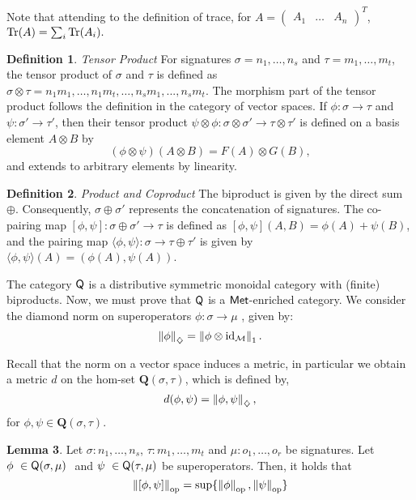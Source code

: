\documentclass[10pt,a4paper]{amsart}
\theoremstyle{definition}
\newtheorem{definition}{Definition}[section]
\theoremstyle{definition}
\theoremstyle{definition}
\newtheorem{lemma}[definition]{Lemma}
\theoremstyle{definition}
\theoremstyle{definition}
\theoremstyle{definition}
\begin{document}
Note that attending to the definition of trace, for $A = \begin{pmatrix} A_1 & \ldots & A_n \end{pmatrix}^T$, $\text{Tr}(A) = \sum_i \text{Tr}(A_i).$
 



\begin{definition} \label{def:tensor} \emph{Tensor Product }
  For signatures $\sigma = n_1, \ldots, n_s $ and $\tau= m_1, \ldots, m_t $, the tensor product of $\sigma$ and $\tau$ is defined as $\sigma \otimes \tau = n_1 m_1, \ldots ,n_1 m_t, \ldots, n_s m_1,...,n_s m_t$. 
  The morphism part of the tensor product follows the definition in the category of vector spaces. If $\phi: \sigma \rightarrow \tau$ and $\psi: \sigma' \rightarrow  \tau'$, then their tensor product $\psi \otimes \phi: \sigma \otimes \sigma' \rightarrow  \tau \otimes \tau' $ is defined on a basis element $A \otimes B$ by  
$$
(\phi \otimes \psi)(A \otimes B) = F(A) \otimes G(B),
$$
and extends to arbitrary elements by linearity.
\end{definition}

\begin{definition} \label{def:biproduct} \emph{Product and Coproduct}
  The biproduct is given by the direct sum $\oplus$. Consequently, $\sigma \oplus \sigma'$ represents the concatenation of signatures. The co-pairing map $[\phi, \psi]: \sigma \oplus \sigma' \to \tau$ is defined as  $[\phi, \psi](A, B) = \phi(A) + \psi(B)$, and the pairing map $\langle \phi, \psi \rangle: \sigma \to \tau \oplus \tau'$ is given by  $\langle \phi, \psi \rangle(A) = (\phi(A), \psi(A))$.
\end{definition}

The category $\mathsf{Q}$ is a distributive symmetric monoidal category with (finite) biproducts. Now, we must prove that $\mathsf{Q}$ is a $\mathsf{Met}$-enriched category. We consider the diamond norm on superoperators $\phi: \sigma \rightarrow \mu$ \cite{watrous2018theory}, given by:
 $$\left\lVert \phi \right\rVert_{\diamondsuit} = \left\lVert  \phi \otimes \mathrm{id}_{\mathcal{M}} \right\rVert_{1}.$$

 Recall that the norm on a vector space induces a metric, in particular we obtain a metric $d$ on the hom-set \(\mathbf{Q}(\sigma, \tau)\),  which is defined by,
\[
d(\phi, \psi) = \left\lVert \phi, \psi \right\rVert_{\diamondsuit},
\]
for \( \phi, \psi \in \mathbf{Q}(\sigma, \tau) \).

\begin{lemma} \label{lem_op_max_trace}
  Let $\sigma: n_1, \ldots, n_s$, $\tau: m_1, \ldots, m_t$ and $\mu: o_1, \ldots, o_r$ be signatures. Let $\phi \in \catQ(\sigma,\mu)  $ and $\psi \in \catQ(\tau,\mu) $ be superoperators. Then, it holds that 
  $$ \left\lVert [\phi, \psi] \right\rVert_{\text{op}}= \sup \{ \left\lVert \phi \right\rVert_{\text{op}},\left\lVert \psi \right\rVert_{\text{op}} \}$$
\end{lemma}
\end{document}
